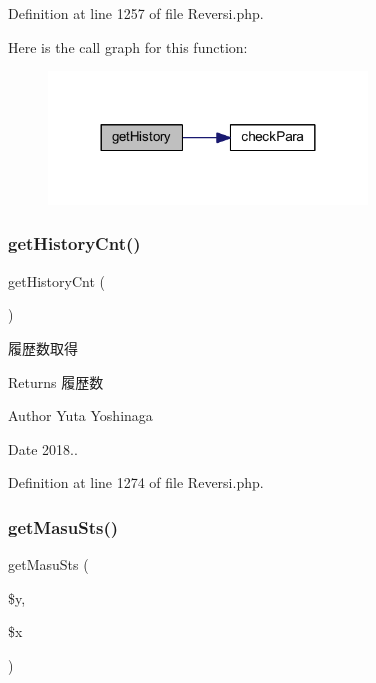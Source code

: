 Definition at line 1257 of file Reversi.\+php.

Here is the call graph for this function\+:
\nopagebreak
\begin{figure}[H]
\begin{center}
\leavevmode
\includegraphics[width=240pt]{class_reversi_a41cae82a798f2b3d0684bda44b837fcf_cgraph}
\end{center}
\end{figure}
\mbox{\label{class_reversi_a004834cf9f95ab56b62c1305bbc68ce2}} 
\subsubsection{\texorpdfstring{get\+History\+Cnt()}{getHistoryCnt()}}
{\footnotesize\ttfamily get\+History\+Cnt (\begin{DoxyParamCaption}{ }\end{DoxyParamCaption})}



履歴数取得 

\begin{DoxyReturn}{Returns}
履歴数 
\end{DoxyReturn}
\begin{DoxyAuthor}{Author}
Yuta Yoshinaga 
\end{DoxyAuthor}
\begin{DoxyDate}{Date}
2018.. 
\end{DoxyDate}


Definition at line 1274 of file Reversi.\+php.

\mbox{\label{class_reversi_a1baed538e7a503cd51850d368b9e65f7}} 
\subsubsection{\texorpdfstring{get\+Masu\+Sts()}{getMasuSts()}}
{\footnotesize\ttfamily get\+Masu\+Sts (\begin{DoxyParamCaption}\item[{}]{\$y,  }\item[{}]{\$x }\end{DoxyParamCaption})}



